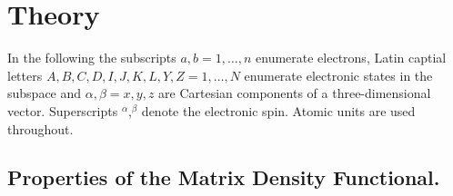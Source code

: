 \documentclass[journal=jpclcd,manuscript=letter]{achemso}
\begin{document}
\section{Theory}
In the following the subscripts $a,b = 1,\ldots,n$ enumerate electrons, Latin captial letters $A,B,C,D,I,J,K,L,Y,Z = 1,\ldots,N$
enumerate electronic states in the subspace and $\alpha,\beta=x,y,z$ are Cartesian components of a three-dimensional vector.
Superscripts $^\alpha$,$^\beta$ denote the electronic spin. Atomic units are used throughout.

\subsection{Properties of the Matrix Density Functional.
\label{sec:properties_analytic_matrix_functional}
}

\end{document}
